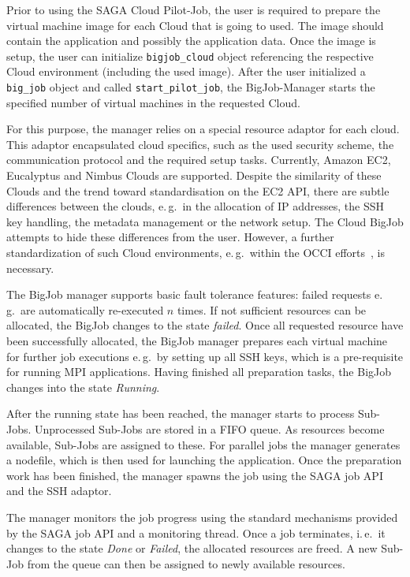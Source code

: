 \documentclass[conference,final]{IEEEtran}
\begin{document}
Prior to using the SAGA Cloud Pilot-Job, the user is required to
prepare the virtual machine image for each Cloud that is going to
used. The image should contain the application and possibly the
application data. Once the image is setup, the user can initialize
\texttt{bigjob\_cloud} object referencing the respective Cloud
environment (including the used image). After the user initialized 
a \texttt{big\_job} object and called \texttt{start\_pilot\_job},
the BigJob-Manager starts the specified number of virtual machines 
in the requested Cloud. 

For this purpose, the manager relies on a special resource adaptor
for each cloud. This adaptor encapsulated cloud specifics, such as the used
security scheme, the communication protocol and the required setup tasks. Currently,
Amazon EC2, Eucalyptus and Nimbus Clouds are supported. Despite the similarity 
of these Clouds and the trend toward standardisation on the
EC2 API, there are subtle differences between the clouds, e.\,g.\ in the allocation
of IP addresses, the SSH key handling, the metadata management or 
the network setup. The Cloud BigJob attempts to hide these differences 
from the user. However, a further standardization of such Cloud environments, 
e.\,g.\ within the OCCI efforts~\cite{occi}, is necessary.


The BigJob manager supports basic fault tolerance features: failed requests e.\,g.\
are automatically re-executed $n$ times. If not sufficient resources can be
allocated, the BigJob changes to the state \emph{failed}.
Once all requested resource have been successfully allocated, the BigJob manager
prepares each virtual machine for further job executions e.\,g.\ by setting
up all SSH keys, which is a pre-requisite for running MPI applications.
Having finished all preparation tasks, the BigJob changes into the state
\emph{Running}. 

After the running state has been reached, the manager starts to process Sub-Jobs.
Unprocessed Sub-Jobs are stored in a FIFO queue. As resources become available,
Sub-Jobs are assigned to these. For parallel jobs the manager generates
a nodefile, which is then used for launching the application. Once the preparation
work has been finished, the manager spawns the job using the SAGA job API and the SSH
adaptor. 

The manager monitors the job progress using the standard mechanisms provided by the
SAGA job API and a monitoring thread. Once a job terminates, i.\,e.\ it changes 
to the state \emph{Done} or \emph{Failed}, the allocated resources are freed. 
A new Sub-Job from the queue can then be assigned to newly available resources.
\end{document}
